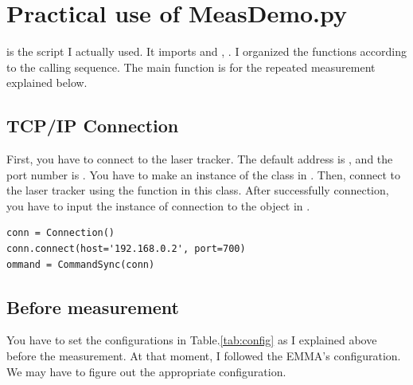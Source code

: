 \documentclass[a4paper,12pt]{article}  %
\begin{document}
\section{Practical use of MeasDemo.py}
 is the script I actually used.
It imports  and , .
I organized the functions according to the calling sequence.
The main function is for the repeated measurement explained below.
\subsection{TCP/IP Connection}
First, you have to connect to the laser tracker.
The default address is , and the port number is .
You have to make an instance of the class in .
Then, connect to the laser tracker using the function in this class.
After successfully connection, you have to input the instance of connection to the object  in .
\begin{lstlisting}[caption={The command to make a connection}, label={lst:conn}]
conn = Connection()
conn.connect(host='192.168.0.2', port=700)
ommand = CommandSync(conn)
\end{lstlisting}

\subsection{Before measurement}
You have to set the configurations in Table.\ref{tab:config} as I explained above before the measurement.
At that moment, I followed the EMMA's configuration.
We may have to figure out the appropriate configuration.
\end{document}
